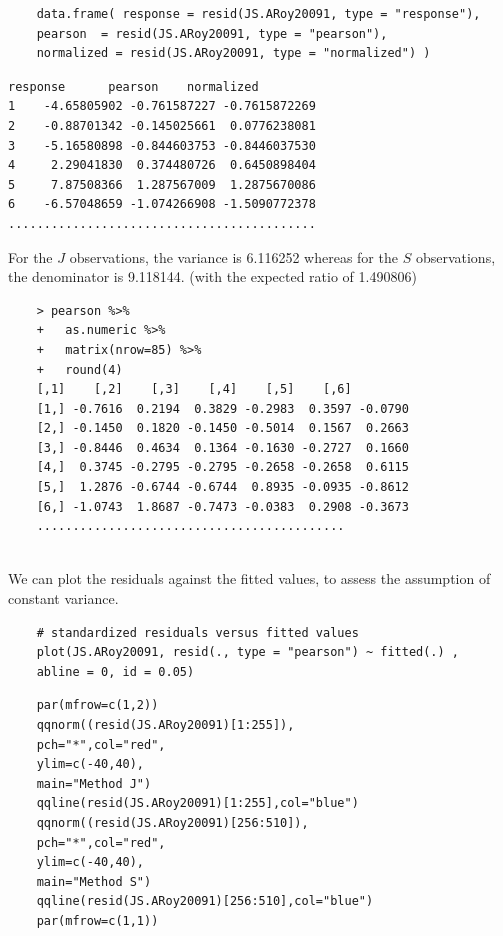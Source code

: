 \documentclass[Main.tex]{subfiles}
\begin{document}
\begin{framed}
	\begin{verbatim}
	data.frame( response = resid(JS.ARoy20091, type = "response"), 
	pearson  = resid(JS.ARoy20091, type = "pearson"), 
	normalized = resid(JS.ARoy20091, type = "normalized") )
	\end{verbatim}
\end{framed}

\begin{verbatim}
response      pearson    normalized
1    -4.65805902 -0.761587227 -0.7615872269
2    -0.88701342 -0.145025661  0.0776238081
3    -5.16580898 -0.844603753 -0.8446037530
4     2.29041830  0.374480726  0.6450898404
5     7.87508366  1.287567009  1.2875670086
6    -6.57048659 -1.074266908 -1.5090772378
...........................................
\end{verbatim}
For the $J$ observations, the variance is 6.116252 whereas for the $S$ observations, the denominator is 9.118144. (with the expected ratio of  1.490806)


\begin{framed}
	\begin{verbatim}
	> pearson %>%
	+   as.numeric %>% 
	+   matrix(nrow=85) %>%
	+   round(4) 
	[,1]    [,2]    [,3]    [,4]    [,5]    [,6]
	[1,] -0.7616  0.2194  0.3829 -0.2983  0.3597 -0.0790
	[2,] -0.1450  0.1820 -0.1450 -0.5014  0.1567  0.2663
	[3,] -0.8446  0.4634  0.1364 -0.1630 -0.2727  0.1660
	[4,]  0.3745 -0.2795 -0.2795 -0.2658 -0.2658  0.6115
	[5,]  1.2876 -0.6744 -0.6744  0.8935 -0.0935 -0.8612
	[6,] -1.0743  1.8687 -0.7473 -0.0383  0.2908 -0.3673
	...........................................
	
	\end{verbatim}
\end{framed}

We can plot the residuals against the fitted values, to assess the assumption of constant variance. 
\begin{framed}
	\begin{verbatim}
	# standardized residuals versus fitted values 
	plot(JS.ARoy20091, resid(., type = "pearson") ~ fitted(.) , 
	abline = 0, id = 0.05)
	\end{verbatim}
\end{framed}


\begin{framed}
	\begin{verbatim}
	par(mfrow=c(1,2))
	qqnorm((resid(JS.ARoy20091)[1:255]),
	pch="*",col="red",
	ylim=c(-40,40),
	main="Method J")
	qqline(resid(JS.ARoy20091)[1:255],col="blue")
	qqnorm((resid(JS.ARoy20091)[256:510]),
	pch="*",col="red",
	ylim=c(-40,40),
	main="Method S")
	qqline(resid(JS.ARoy20091)[256:510],col="blue")
	par(mfrow=c(1,1))
	\end{verbatim}	
\end{framed}
\end{document}
